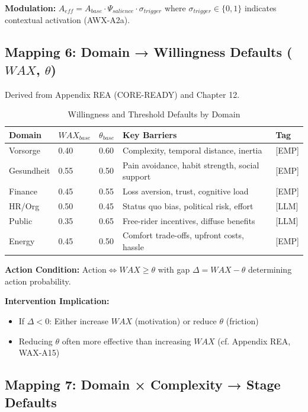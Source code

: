 \textbf{Modulation:} $A_{eff} = A_{base} \cdot \Psi_{salience} \cdot \sigma_{trigger}$ where $\sigma_{trigger} \in \{0,1\}$ indicates contextual activation (AWX-A2a).


\subsection{Mapping 6: Domain → Willingness Defaults ($WAX$, $\theta$)}

Derived from Appendix REA (CORE-READY) and Chapter 12.

\begin{table}[htbp]
\centering
\caption{Willingness and Threshold Defaults by Domain}
\label{tab:ggg-willingness-mapping}
\renewcommand{\arraystretch}{1.3}
\begin{tabular}{@{}lllp{4cm}l@{}}
\toprule
\textbf{Domain} & \textbf{$WAX_{base}$} & \textbf{$\theta_{base}$} & \textbf{Key Barriers} & \textbf{Tag} \\
\midrule
Vorsorge & 0.40 & 0.60 & Complexity, temporal distance, inertia & [EMP] \\
Gesundheit & 0.55 & 0.50 & Pain avoidance, habit strength, social support & [EMP] \\
Finance & 0.45 & 0.55 & Loss aversion, trust, cognitive load & [EMP] \\
HR/Org & 0.50 & 0.45 & Status quo bias, political risk, effort & [LLM] \\
Public & 0.35 & 0.65 & Free-rider incentives, diffuse benefits & [LLM] \\
Energy & 0.45 & 0.50 & Comfort trade-offs, upfront costs, hassle & [EMP] \\
\bottomrule
\end{tabular}
\end{table}

\textbf{Action Condition:} $\text{Action} \Leftrightarrow WAX \geq \theta$ with gap $\Delta = WAX - \theta$ determining action probability.

\textbf{Intervention Implication:}
\begin{itemize}[nosep]
\item If $\Delta < 0$: Either increase $WAX$ (motivation) or reduce $\theta$ (friction)
\item Reducing $\theta$ often more effective than increasing $WAX$ (cf. Appendix REA, WAX-A15)
\end{itemize}


\subsection{Mapping 7: Domain × Complexity → Stage Defaults}

